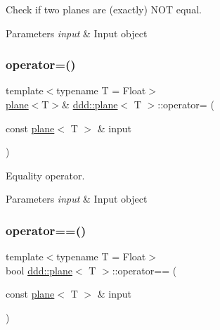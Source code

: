 Check if two planes are (exactly) N\+OT equal. 


\begin{DoxyParams}{Parameters}
{\em input} & Input object \\
\hline
\end{DoxyParams}
\mbox{\label{classddd_1_1plane_a4a32afd2bc44926aceccef5de9798945}} 
\subsubsection{\texorpdfstring{operator=()}{operator=()}}
{\footnotesize\ttfamily template$<$typename T = Float$>$ \\
\hyperlink{classddd_1_1plane}{plane}$<$T$>$\& \hyperlink{classddd_1_1plane}{ddd\+::plane}$<$ T $>$\+::operator= (\begin{DoxyParamCaption}\item[{const \hyperlink{classddd_1_1plane}{plane}$<$ T $>$ \&}]{input }\end{DoxyParamCaption})\hspace{0.3cm}{\ttfamily [inline]}}



Equality operator. 


\begin{DoxyParams}{Parameters}
{\em input} & Input object \\
\hline
\end{DoxyParams}
\mbox{\label{classddd_1_1plane_abca107b7efbe4553cfb980cddb7bbf9a}} 
\subsubsection{\texorpdfstring{operator==()}{operator==()}}
{\footnotesize\ttfamily template$<$typename T = Float$>$ \\
bool \hyperlink{classddd_1_1plane}{ddd\+::plane}$<$ T $>$\+::operator== (\begin{DoxyParamCaption}\item[{const \hyperlink{classddd_1_1plane}{plane}$<$ T $>$ \&}]{input }\end{DoxyParamCaption})\hspace{0.3cm}{\ttfamily [inline]}}



